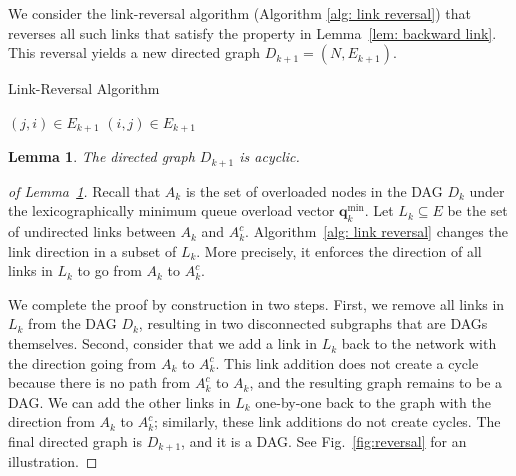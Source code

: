 \documentclass{sig-alternate-2013}
\newtheorem{lemma}{Lemma}
\begin{document}
We consider the link-reversal algorithm (Algorithm \ref{alg: link reversal}) that reverses all such links that satisfy the property in Lemma~\ref{lem: backward link}. This reversal yields a new directed graph $D_{k+1} = (N, E_{k+1})$.
\begin{algorithm}[h!] 
\caption{Link-Reversal Algorithm}
\label{alg: link reversal}
\begin{algorithmic}[1]
			\State $(j,i) \in E_{k+1} $
		\Else
			\State $(i,j) \in E_{k+1}$
		\EndIf
	\EndFor
\end{algorithmic}
\end{algorithm}

\begin{lemma} \label{lem: graph is dag}
The directed graph $D_{k+1}$ is acyclic.
\end{lemma}
\begin{proof}[of Lemma~\ref{lem: graph is dag}]
Recall that  $A_{k}$ is the set of overloaded nodes in the DAG $D_{k}$ under the lexicographically minimum queue overload vector $\bm{q}_{k}^{\text{min}}$. Let $L_{k}\subseteq E$ be the set of undirected links between $A_{k}$ and $A_{k}^{c}$. Algorithm~\ref{alg: link reversal} 
changes the link direction in a subset of $L_{k}$. More precisely, it 
enforces the direction of all links in $L_{k}$ to go from $A_{k}$ to $A_{k}^{c}$.

We complete the proof by construction in two steps. First, we remove all links in $L_{k}$ from the DAG $D_{k}$, resulting in two disconnected subgraphs that are DAGs themselves. Second, consider that we add a link in $L_{k}$ back to the network with the direction going from $A_{k}$ to $A_{k}^{c}$. This link addition does not create a cycle because there is no path from $A_{k}^{c}$ to $A_{k}$, and the resulting graph remains to be a DAG. We can add the other links in $L_{k}$ one-by-one back to the graph with the direction from $A_{k}$ to $A_{k}^{c}$; similarly, these link additions do not create cycles. The final directed graph is $D_{k+1}$, and it is a DAG. See Fig.~\ref{fig:reversal} for an illustration.
\end{proof}
\end{document}
